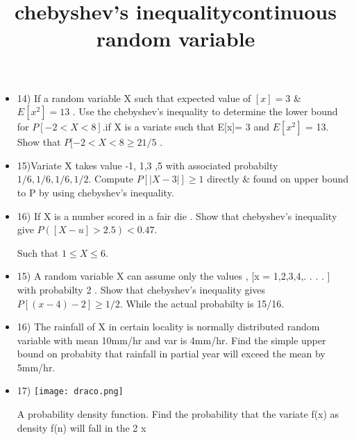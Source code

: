 \documentclass{article}
\begin{document}
\title{\Large chebyshev's inequality}

\begin{itemize}

    
    \item 14) If a random variable X such that expected value of $[x]= 3$  & $E[x^2]= 13$ . Use the chebyshev's inequality to determine the lower bound for $P[ -2 < X < 8]$.if X is a variate such that E[x]= 3 and $E[x^2]$ = 13. Show that $P[-2 < X < 8 \geq 21/5$ . 

    \item 15)Variate X takes value -1, 1,3 ,5 with associated probabilty 
    $1/6, 1/6, 1/6, 1/2$. Compute $P[|X-3|] \geq 1$ directly & found on upper bound to P by using chebyshev's inequality.

    \item 16) If X is a number scored in a fair die . Show that chebyshev's inequality give $P([X-u] > 2.5) < 0.47$.

   Such that $1 \leq X \leq 6$.

   \item 15) A random variable X can assume only the values , [x = 1,2,3,4,. . . . ] with probabilty 2 . Show that chebyshev's inequality gives $P[(x-4)-2] \geq 1/2$. While the actual probabilty is 15/16. 

   \item  16) The rainfall of X in certain locality is normally distributed random variable with mean 10mm/hr and var is 4mm/hr. Find the simple upper bound on probabity that rainfall in partial year will exceed the mean by 5mm/hr.
\end{itemize}

\title{\Large continuous random variable}
\begin{itemize}
    \item 17) \texttt{[image: draco.png]}

    A probability density function. Find the probability that the variate f(x) as density f(n) will fall in the 2 \leq x 
\end{itemize}
\end{document}
